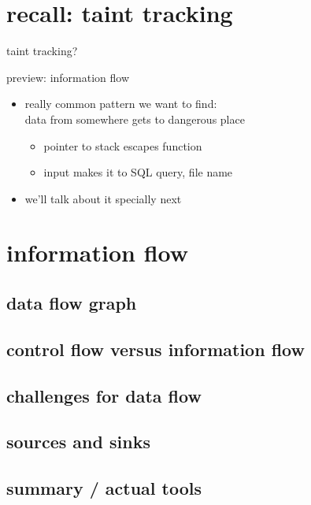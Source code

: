 \section{recall: taint tracking}
\begin{frame}{taint tracking?}
\end{frame}

\begin{frame}{preview: information flow}
    \begin{itemize}
    \item really common pattern we want to find: \\
        data from somewhere gets to dangerous place
        \begin{itemize}
        \item pointer to stack escapes function
        \item input makes it to SQL query, file name
        \end{itemize}
    \item we'll talk about it specially next
    \end{itemize}
\end{frame}

\section{information flow}


\subsection{data flow graph}


\subsection{control flow versus information flow} 


\subsection{challenges for data flow}


\subsection{sources and sinks}



\subsection{summary / actual tools}

